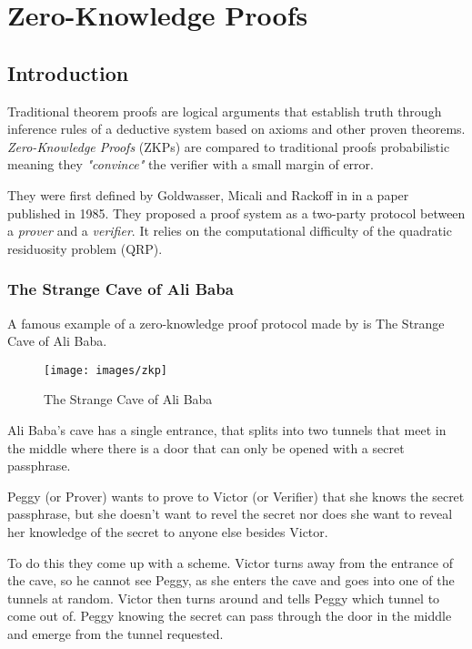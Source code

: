 \section{Zero-Knowledge Proofs}

\subsection{Introduction}

Traditional theorem proofs are logical arguments that establish truth through inference rules of a deductive system based on axioms and other proven theorems.
\textit{Zero-Knowledge Proofs} (ZKPs) are compared to traditional proofs probabilistic meaning they \textit{"convince"} the verifier with a small margin of error.

They were first defined by Goldwasser, Micali and Rackoff in \cite{GMR} in a paper published in 1985. 
They proposed a proof system as a two-party protocol between a \textit{prover} and a \textit{verifier}. 
It relies on the computational difficulty of the quadratic residuosity problem (QRP).

\subsubsection{The Strange Cave of Ali Baba}
A famous example of a zero-knowledge proof protocol made by \cite{QJM} is The Strange Cave of Ali Baba.

\begin{figure}[h]
	\centering
	\texttt{[image: images/zkp]}
	\caption{The Strange Cave of Ali Baba}
	\label{fig:strange-cave-of-alibaba}
\end{figure}

\bigskip

Ali Baba's cave has a single entrance, that splits into two tunnels that meet in the middle where there is a door that can only be opened with a secret passphrase.

\bigskip

Peggy (or Prover) wants to prove to Victor (or Verifier) that she knows the secret passphrase, but she doesn't want to revel the secret nor does she want to reveal her knowledge of the secret to anyone else besides Victor.

\bigskip

To do this they come up with a scheme.
Victor turns away from the entrance of the cave, so he cannot see Peggy, as she enters the cave and goes into one of the tunnels at random. 
Victor then turns around and tells Peggy which tunnel to come out of.
Peggy knowing the secret can pass through the door in the middle and emerge from the tunnel requested.

